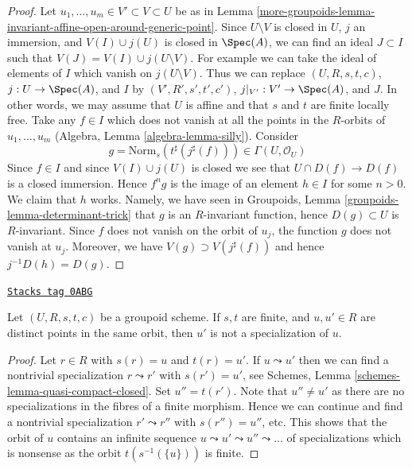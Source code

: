 \begin{proof}
Let $u_1, \ldots, u_m \in V' \subset V \subset U$ be as in
Lemma \ref{more-groupoids-lemma-invariant-affine-open-around-generic-point}.
Since $U \setminus V$ is closed in $U$, $j$ an immersion, and $V(I) \cup j(U)$
is closed in $\Spec(A)$, we can find an ideal
$J \subset I$ such that $V(J) = V(I) \cup j(U \setminus V)$.
For example we can take the ideal of elements of $I$ which
vanish on $j(U \setminus V)$. Thus we can replace
$(U, R, s, t, c)$, $j : U \to \Spec(A)$, and $I$ by
$(V', R', s', t', c')$, $j|_{V'} : V' \to \Spec(A)$, and $J$.
In other words, we may assume that $U$ is affine and that
$s$ and $t$ are finite locally free.
Take any $f \in I$ which does not vanish at all the
points in the $R$-orbits of $u_1, \ldots, u_m$
(Algebra, Lemma \ref{algebra-lemma-silly}). Consider
$$
g = \text{Norm}_s(t^\sharp(j^\sharp(f))) \in \Gamma(U, \mathcal{O}_U)
$$
Since $f \in I$ and since $V(I) \cup j(U)$ is closed we see that
$U \cap D(f) \to D(f)$ is a closed immersion. Hence $f^ng$ is the
image of an element $h \in I$ for some $n > 0$. We claim that $h$ works.
Namely, we have seen in
Groupoids, Lemma \ref{groupoids-lemma-determinant-trick}
that $g$ is an $R$-invariant function, hence $D(g) \subset U$
is $R$-invariant. Since $f$ does not vanish on the orbit of $u_j$,
the function $g$ does not vanish at $u_j$. Moreover, we have
$V(g) \supset V(j^\sharp(f))$ and hence $j^{-1}D(h) = D(g)$.
\end{proof}

\begin{lemma}
\label{more-groupoids-lemma-no-specializations-map-to-same-point}
\href{https://stacks.math.columbia.edu/tag/0ABG}{\texttt{Stacks tag 0ABG}}

Let $(U, R, s, t, c)$ be a groupoid scheme. If $s, t$ are finite,
and $u, u' \in R$ are distinct points in the same orbit,
then $u'$ is not a specialization of $u$.
\end{lemma}

\begin{proof}
Let $r \in R$ with $s(r) = u$ and $t(r) = u'$. If $u \leadsto u'$
then we can find a nontrivial specialization $r \leadsto r'$ with
$s(r') = u'$, see
Schemes, Lemma \ref{schemes-lemma-quasi-compact-closed}.
Set $u'' = t(r')$. Note that $u'' \not = u'$ as there are no
specializations in the fibres of a finite morphism.
Hence we can continue and find a nontrivial specialization
$r' \leadsto r''$ with $s(r'') = u''$, etc. This shows that the
orbit of $u$ contains an infinite sequence
$u \leadsto u' \leadsto u'' \leadsto \ldots$
of specializations which is nonsense as the orbit
$t(s^{-1}(\{u\}))$ is finite.
\end{proof}

